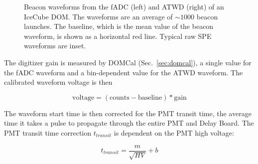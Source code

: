 \begin{figure}[!h]
  \captionsetup[subfigure]{labelformat=empty}
  \centering
  \caption{Beacon waveforms from the fADC (left) and ATWD (right) of
    an IceCube DOM. The waveforms are an average of $\sim1000$ beacon
   launches. The baseline, which is the mean value of the
    beacon waveform, is shown as a horizontal red line. Typical raw SPE
    waveforms are inset.}
  \label{fig:raw_baselines}
\end{figure}

The digitizer gain is measured by DOMCal (Sec.~\ref{sec:domcal}), a single
value for the fADC waveform and a bin-dependent value for the ATWD
waveform. The calibrated waveform voltage is then

\begin{equation}
  \mathrm{voltage} = \mathrm{(counts - baseline)*gain}
\end{equation}

The waveform start time is then corrected for the PMT transit time,
the average time it takes a pulse to propagate through the entire
PMT and Delay Board. The PMT transit time correction $t_{transit}$ is
dependent on the PMT high voltage:

\begin{equation}
  t_{transit} = \frac{m}{\sqrt{HV}} + b
\end{equation}

